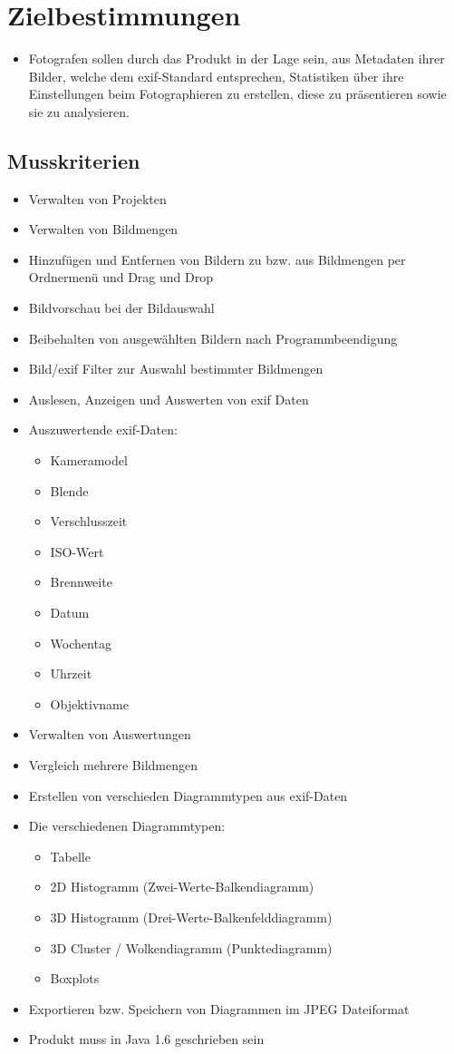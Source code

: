 \section{Zielbestimmungen}
\begin{itemize}
  \item Fotografen sollen durch das Produkt in der Lage sein, aus Metadaten ihrer Bilder, welche dem \gls{exif}-Standard entsprechen, Statistiken über ihre Einstellungen beim Fotographieren zu erstellen, diese zu präsentieren sowie sie zu analysieren.
  \end{itemize} 
\subsection{Musskriterien} 
\begin{itemize}
	\item Verwalten von Projekten
	\item Verwalten von Bildmengen
	\item Hinzufügen und Entfernen von Bildern zu bzw. aus Bildmengen per Ordnermenü und Drag und Drop
	\item Bildvorschau bei der Bildauswahl
	\item Beibehalten von ausgewählten Bildern nach Programmbeendigung
	\item Bild/\gls{exif} Filter zur Auswahl bestimmter Bildmengen
	\item Auslesen, Anzeigen und Auswerten von \gls{exif} Daten
	\item Auszuwertende \gls{exif}-Daten:
			\begin{itemize}
			\item Kameramodel
			\item Blende 
			\item Verschlusszeit
			\item ISO-Wert
			\item Brennweite
			\item Datum
			\item Wochentag
			\item Uhrzeit
			\item Objektivname
		\end{itemize}
	\item Verwalten von Auswertungen
	\item Vergleich mehrere Bildmengen
	\item Erstellen von verschieden Diagrammtypen aus \gls{exif}-Daten
	\item Die verschiedenen Diagrammtypen:
		\begin{itemize}
		  \item Tabelle
			\item 2D Histogramm (Zwei-Werte-Balkendiagramm)
			\item 3D Histogramm (Drei-Werte-Balkenfelddiagramm)
			\item 3D Cluster / Wolkendiagramm (Punktediagramm)
			\item Boxplots
		\end{itemize}
	\item Exportieren bzw. Speichern von Diagrammen im JPEG Dateiformat
	\item Produkt muss in Java 1.6 geschrieben sein	
\end{itemize}

